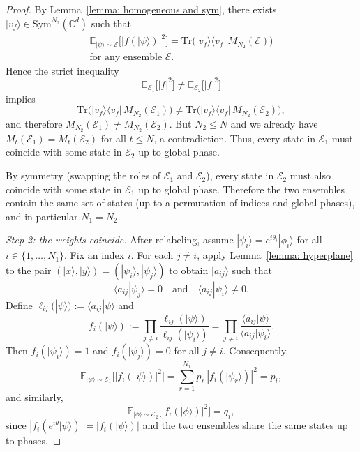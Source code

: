 \documentclass[aps,prx,reprint,superscriptaddress,amsmath,amssymb,longbibliography,floatfix]{revtex4-2}
\newcommand{\Abs}[1]{\left\lvert #1\right\rvert}
\providecommand{\ket}[1]{|#1 \rangle}
\providecommand{\braket}[2]{\langle #1|#2 \rangle}
\providecommand{\ketbra}[2]{|#1\rangle \langle #2|}
\newcommand{\dsE}{\mathbb{E}}
\theoremstyle{plain}
\theoremstyle{definition}
\theoremstyle{remark}
\begin{document}
\begin{proof}
By Lemma~\ref{lemma: homogeneous and sym}, there exists $\ket{v_f}\in\mathrm{Sym}^{N_2}(\mathbb C^d)$
such that
\[
\begin{gathered}
\dsE_{\ket{\psi}\sim\mathcal E}\!\big[\Abs{f(\ket{\psi})}^2\big]
=
\mathrm{Tr}\!\Big(\ketbra{v_f}{v_f}\,M_{N_2}(\mathcal E)\Big)
\\
\text{for any ensemble }\mathcal E.
\end{gathered}
\]
Hence the strict inequality
\[
\dsE_{\mathcal E_1}\!\big[\Abs{f}^2\big] \neq \dsE_{\mathcal E_2}\!\big[\Abs{f}^2\big]
\]
implies
\[
\mathrm{Tr}\!\Big(\ketbra{v_f}{v_f}\,M_{N_2}(\mathcal E_1)\Big)
\neq
\mathrm{Tr}\!\Big(\ketbra{v_f}{v_f}\,M_{N_2}(\mathcal E_2)\Big),
\]
and therefore $M_{N_2}(\mathcal E_1)\neq M_{N_2}(\mathcal E_2)$.
But $N_2\le N$ and we already have $M_t(\mathcal E_1)=M_t(\mathcal E_2)$ for all $t\le N$, a contradiction.
Thus, every state in $\mathcal E_1$ must coincide with some state in $\mathcal E_2$ up to global phase.

By symmetry (swapping the roles of $\mathcal E_1$ and $\mathcal E_2$), every state in $\mathcal E_2$ must also coincide
with some state in $\mathcal E_1$ up to global phase. Therefore the two ensembles contain the same set of states (up to
a permutation of indices and global phases), and in particular $N_1=N_2$.

\medskip
\noindent\textit{Step 2: the weights coincide.}
After relabeling, assume $\ket{\psi_i}=e^{i\theta_i}\ket{\phi_i}$ for all $i\in\{1,\dots,N_1\}$.
Fix an index $i$. For each $j\neq i$, apply Lemma~\ref{lemma: hyperplane}
to the pair $(\ket{x},\ket{y})=(\ket{\psi_i},\ket{\psi_j})$ to obtain $\ket{a_{ij}}$ such that
\[
\braket{a_{ij}}{\psi_j}=0
\quad\text{and}\quad
\braket{a_{ij}}{\psi_i}\neq 0.
\]
Define $\ell_{ij}(\ket{\psi}) := \braket{a_{ij}}{\psi}$ and
\begin{equation}
f_i(\ket{\psi})
:=\prod_{j\neq i}\frac{\ell_{ij}(\ket{\psi})}{\ell_{ij}(\ket{\psi_i})}
=\prod_{j\neq i}\frac{\braket{a_{ij}}{\psi}}{\braket{a_{ij}}{\psi_i}}.
\label{eq:app-weight-interpolation-polynomial}
\end{equation}
Then $f_i(\ket{\psi_i})=1$ and $f_i(\ket{\psi_j})=0$ for all $j\neq i$.
Consequently,
\[
\dsE_{\ket{\psi}\sim\mathcal E_1}\!\big[\Abs{f_i(\ket{\psi})}^2\big]
= \sum_{r=1}^{N_1} p_r\,\Abs{f_i(\ket{\psi_r})}^2
= p_i,
\]
and similarly,
\[
\dsE_{\ket{\phi}\sim\mathcal E_2}\!\big[\Abs{f_i(\ket{\phi})}^2\big]
= q_i,
\]
since $\Abs{f_i(e^{i\theta}\ket{\psi})}=\Abs{f_i(\ket{\psi})}$ and the two ensembles share the same states up to phases.


\end{proof}
\end{document}
